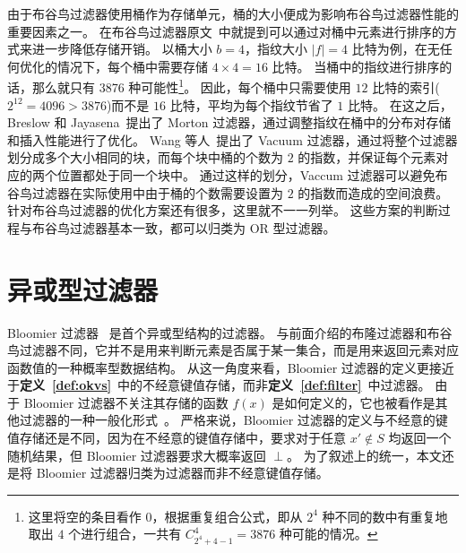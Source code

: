 

由于布谷鸟过滤器使用桶作为存储单元，桶的大小便成为影响布谷鸟过滤器性能的重要因素之一。
在布谷鸟过滤器原文~\cite{fan2014cuckoo}中就提到可以通过对桶中元素进行排序的方式来进一步降低存储开销。
以桶大小 $b=4$，指纹大小 $|f| = 4$ 比特为例，在无任何优化的情况下，每个桶中需要存储 $4\times 4 = 16$ 比特。
当桶中的指纹进行排序的话，那么就只有 \num{3876} 种可能性\footnote{这里将空的条目看作 $0$，根据重复组合公式，即从 $2^4$ 种不同的数中有重复地取出 $4$ 个进行组合，一共有 $C_{2^4 + 4 - 1}^4 = 3876$ 种可能的情况。}。
因此，每个桶中只需要使用 $12$ 比特的索引($2^{12}=4096>3876$)而不是 $16$ 比特，平均为每个指纹节省了 $1$ 比特。
在这之后，Breslow 和 Jayasena~\cite{breslow2020morton}提出了 Morton 过滤器，通过调整指纹在桶中的分布对存储和插入性能进行了优化。
Wang 等人~\cite{wang2019vacuum}提出了 Vacuum 过滤器，通过将整个过滤器划分成多个大小相同的块，而每个块中桶的个数为 $2$ 的指数，并保证每个元素对应的两个位置都处于同一个块中。
通过这样的划分，Vaccum 过滤器可以避免布谷鸟过滤器在实际使用中由于桶的个数需要设置为 $2$ 的指数而造成的空间浪费。
针对布谷鸟过滤器的优化方案还有很多，这里就不一一列举。
这些方案的判断过程与布谷鸟过滤器基本一致，都可以归类为 OR 型过滤器。

\section{异或型过滤器}\label{sec:xor-based-filters}

Bloomier 过滤器~\cite{chazelle2004bloomier,charles2008bloomier} 是首个异或型结构的过滤器。
与前面介绍的布隆过滤器和布谷鸟过滤器不同，它并不是用来判断元素是否属于某一集合，而是用来返回元素对应函数值的一种概率型数据结构。
从这一角度来看，Bloomier 过滤器的定义更接近于\textbf{定义~\ref{def:okvs}}~中的不经意键值存储，而非\textbf{定义~\ref{def:filter}}~中过滤器。
由于 Bloomier 过滤器不关注其存储的函数 $f(x)$ 是如何定义的，它也被看作是其他过滤器的一种一般化形式~\cite{graf2020xor,li2023chainedfilter}。
严格来说，Bloomier 过滤器的定义与不经意的键值存储还是不同，因为在不经意的键值存储中，要求对于任意 $x'\notin S$ 均返回一个随机结果，但 Bloomier 过滤器要求大概率返回 $\perp$。
为了叙述上的统一，本文还是将 Bloomier 过滤器归类为过滤器而非不经意键值存储。


